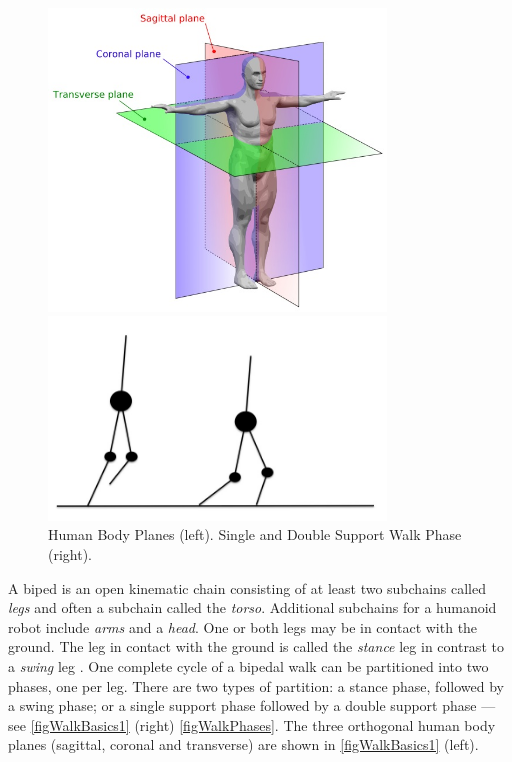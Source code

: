 \documentclass[pdftex,11pt,a4paper]{report}
\begin{document}
\begin{figure}[ht]
  \centering
  \begin{minipage}[b]{8 cm}
    \includegraphics[width=0.8\textwidth]{figures/BodyPlanes.jpg}  
  \end{minipage}
  \begin{minipage}[b]{8 cm}
    \includegraphics[width=0.8\textwidth]{figures/SingleDouble.jpg}  
  \end{minipage}
  \caption{Human Body Planes (left). Single and Double Support Walk Phase (right).}
  \label{figWalkBasics1}
\end{figure}

A biped is an open kinematic chain consisting of at least two subchains called \emph{legs} and often a subchain called the \emph{torso}. Additional subchains for a humanoid robot include \emph{arms} and a \emph{head}. One or both legs may be in contact with the ground. The leg in contact with the ground is called the \emph{stance} leg in contrast to a \emph{swing} leg \cite{Westervelt:2007fk}. One complete cycle of a bipedal walk can be partitioned into two phases, one per leg. There are two types of partition: a stance phase, followed by a swing phase; or a single support phase followed by a double support phase --- see \autoref{figWalkBasics1} (right) \autoref{figWalkPhases}. The three orthogonal human body planes (sagittal, coronal and transverse) are shown in \autoref{figWalkBasics1} (left).
\end{document}
